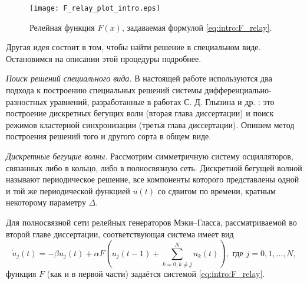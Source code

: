 \begin{figure}[ht]
	\centering
	\texttt{[image: F\_relay\_plot\_intro.eps]}
	\caption{Релейная функция $F(x)$, задаваемая формулой \eqref{eq:intro:F_relay}.}
	\label{fig:F_relay_plot:intro}
\end{figure}

Другая идея состоит в том, чтобы найти решение в специальном виде. Остановимся на описании этой процедуры подробнее.


\textit{Поиск решений специального вида.} В настоящей работе используются два подхода к построению специальных решений системы дифференциально-разностных уравнений, разработанные в работах С. Д. Глызина и др. \cite{GlyKol2013, GlyKol2013a, Glyzin2014}: это построение дискретных бегущих волн (вторая глава диссертации) и поиск режимов кластерной синхронизации (третья глава диссертации). Опишем метод построения решений того и другого сорта в общем виде.

\textit{Дискретные бегущие волны.} Рассмотрим симметричную систему осцилляторов, связанных либо в кольцо, либо в полносвязную сеть. Дискретной бегущей волной называют периодическое решение, все компоненты которого представлены одной и той же периодической функцией $u(t)$ со сдвигом по времени, кратным некоторому параметру $\Delta$.


Для полносвязной сети релейных генераторов Мэки--Гласса, рассматриваемой во второй главе диссертации, соответствующая система имеет вид
%
\begin{equation}
	\label{eq:intro:mg_full_renormed}
	\dot{u}_j(t) = -\beta u_j(t) + \alpha F \left(u_j(t - 1) + \sum\limits_{k = 0, k\neq j}^N u_k(t)\right), \text{ где } j = 0, 1, \dots, N,
\end{equation}
функция $F$ (как и в первой части) задаётся системой \eqref{eq:intro:F_relay}.

